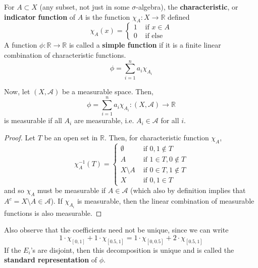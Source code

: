   \begin{definition}
    For $A \subset X$ (any subset, not just in some $\sigma$-algebra), the \textbf{characteristic}, or \textbf{indicator} \textbf{function} of $A$ is the function $\chi_A : X \longrightarrow \mathbb{R}$ defined 
    \begin{equation}
      \chi_A (x) = \begin{cases} 1 & \text{ if } x \in A \\ 0 & \text{ if else} \end{cases}
    \end{equation}
    A function $\phi: \mathbb{R} \longrightarrow \mathbb{R}$ is called a \textbf{simple function} if it is a finite linear combination of characteristic functions. 
    \begin{equation}
      \phi = \sum_{i=1}^n a_i \chi_{A_i}
    \end{equation}
  \end{definition}

  \begin{lemma}
    Now, let $(X, \mathcal{A})$ be a measurable space. Then, 
    \begin{equation}
      \phi = \sum_{i=1}^n a_i \chi_{A_i} : (X, \mathcal{A}) \longrightarrow \mathbb{R}
    \end{equation}
    is measurable if all $A_i$ are measurable, i.e. $A_i \in \mathcal{A}$ for all $i$. 
  \end{lemma}
  \begin{proof}
    Let $T$ be an open set in $\mathbb{R}$. Then, for characteristic function $\chi_A$, 
    \begin{equation}
      \chi_A^{-1} (T) = \begin{cases} 
      \emptyset & \text{ if } 0, 1 \not\in T \\
      A & \text{ if } 1 \in T, 0 \not\in T \\
      X \setminus A & \text{ if } 0 \in T, 1 \not\in T \\
      X & \text{ if } 0, 1 \in T
      \end{cases}
    \end{equation}
    and so $\chi_A$ must be measurable if $A \in \mathcal{A}$ (which also by definition implies that $A^c = X \setminus A \in \mathcal{A}$). If $\chi_{A_i}$ is measurable, then the linear combination of measurable functions is also measurable. 
  \end{proof}

  Also observe that the coefficients need not be unique, since we can write 
  \begin{equation}
    1 \cdot \chi_{[0, 1]} + 1 \cdot \chi_{[0.5, 1]} = 1 \cdot \chi_{[0, 0.5]} + 2 \cdot \chi_{[0.5, 1]}
  \end{equation}
  If the $E_i$'s are disjoint, then this decomposition is unique and is called the \textbf{standard representation} of $\phi$. 

